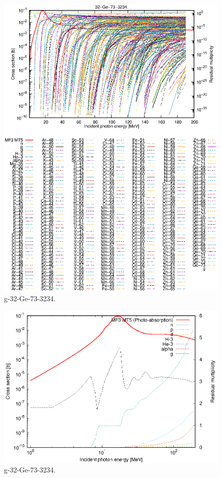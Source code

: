 \begin{figure}
 \includegraphics[width=\linewidth]{eps/g_32-Ge-73_3234.eps}
  \caption{g-32-Ge-73-3234.}
\end{figure}
\newpage \clearpage

\begin{figure}
 \includegraphics[width=\linewidth]{eps-log/g_32-Ge-73_3234.eps}
 \caption{g-32-Ge-73-3234.}
\end{figure}
\newpage \clearpage

